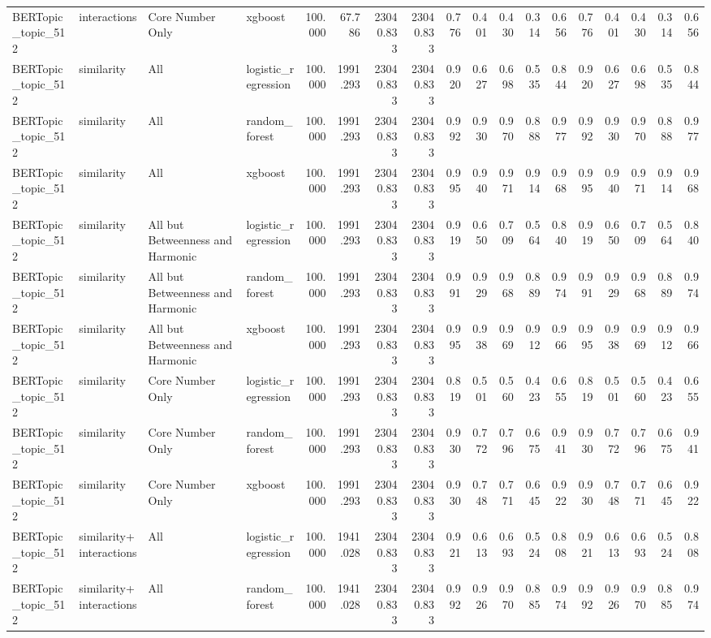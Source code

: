 \begin{tabular}{llllrrrrrrrrrrrrrr}
BERTopic_topic_512 & interactions & Core Number Only & xgboost & 100.000 & 67.786 & 23040.833 & 23040.833 & 0.776 & 0.401 & 0.430 & 0.314 & 0.656 & 0.776 & 0.401 & 0.430 & 0.314 & 0.656 \\
BERTopic_topic_512 & similarity & All & logistic_regression & 100.000 & 1991.293 & 23040.833 & 23040.833 & 0.920 & 0.627 & 0.698 & 0.535 & 0.844 & 0.920 & 0.627 & 0.698 & 0.535 & 0.844 \\
BERTopic_topic_512 & similarity & All & random_forest & 100.000 & 1991.293 & 23040.833 & 23040.833 & 0.992 & 0.930 & 0.970 & 0.888 & 0.977 & 0.992 & 0.930 & 0.970 & 0.888 & 0.977 \\
BERTopic_topic_512 & similarity & All & xgboost & 100.000 & 1991.293 & 23040.833 & 23040.833 & 0.995 & 0.940 & 0.971 & 0.914 & 0.968 & 0.995 & 0.940 & 0.971 & 0.914 & 0.968 \\
BERTopic_topic_512 & similarity & All but Betweenness and Harmonic & logistic_regression & 100.000 & 1991.293 & 23040.833 & 23040.833 & 0.919 & 0.650 & 0.709 & 0.564 & 0.840 & 0.919 & 0.650 & 0.709 & 0.564 & 0.840 \\
BERTopic_topic_512 & similarity & All but Betweenness and Harmonic & random_forest & 100.000 & 1991.293 & 23040.833 & 23040.833 & 0.991 & 0.929 & 0.968 & 0.889 & 0.974 & 0.991 & 0.929 & 0.968 & 0.889 & 0.974 \\
BERTopic_topic_512 & similarity & All but Betweenness and Harmonic & xgboost & 100.000 & 1991.293 & 23040.833 & 23040.833 & 0.995 & 0.938 & 0.969 & 0.912 & 0.966 & 0.995 & 0.938 & 0.969 & 0.912 & 0.966 \\
BERTopic_topic_512 & similarity & Core Number Only & logistic_regression & 100.000 & 1991.293 & 23040.833 & 23040.833 & 0.819 & 0.501 & 0.560 & 0.423 & 0.655 & 0.819 & 0.501 & 0.560 & 0.423 & 0.655 \\
BERTopic_topic_512 & similarity & Core Number Only & random_forest & 100.000 & 1991.293 & 23040.833 & 23040.833 & 0.930 & 0.772 & 0.796 & 0.675 & 0.941 & 0.930 & 0.772 & 0.796 & 0.675 & 0.941 \\
BERTopic_topic_512 & similarity & Core Number Only & xgboost & 100.000 & 1991.293 & 23040.833 & 23040.833 & 0.930 & 0.748 & 0.771 & 0.645 & 0.922 & 0.930 & 0.748 & 0.771 & 0.645 & 0.922 \\
BERTopic_topic_512 & similarity+interactions & All & logistic_regression & 100.000 & 1941.028 & 23040.833 & 23040.833 & 0.921 & 0.613 & 0.693 & 0.524 & 0.808 & 0.921 & 0.613 & 0.693 & 0.524 & 0.808 \\
BERTopic_topic_512 & similarity+interactions & All & random_forest & 100.000 & 1941.028 & 23040.833 & 23040.833 & 0.992 & 0.926 & 0.970 & 0.885 & 0.974 & 0.992 & 0.926 & 0.970 & 0.885 & 0.974 \\

\end{tabular}
